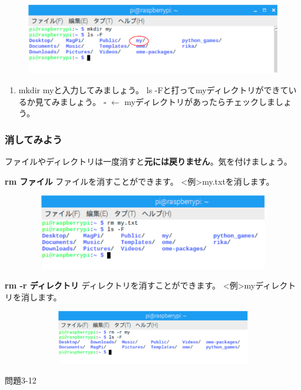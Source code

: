\documentclass[a4paper,dvipdfmx]{jarticle}
\begin{document}
\begin{figure}
\centering
\includegraphics[width=15.794cm,height=3.078cm]{text03-img/text03-img021.png}
\end{figure}
\begin{enumerate}
\item mkdir myと入力してみましょう。\newline
ls
{}-Fと打ってmyディレクトリができているか見てみましょう。\newline
${\square}$ $\leftarrow $
myディレクトリがあったらチェックしましょう。\newline

\end{enumerate}
\subsubsection{消してみよう}
ファイルやディレクトリは一度消すと\textbf{元には戻りません}。気を付けましょう。

\textbf{rm ファイル}\newline
ファイルを消すことができます。\newline
{\textless}例{\textgreater}my.txtを消します。



\begin{figure}
\centering
\includegraphics[width=13.49cm,height=3.293cm]{text03-img/text03-img022.png}
\end{figure}
\textbf{rm {}-r ディレクトリ}\newline
ディレクトリを消すことができます。\newline
{\textless}例{\textgreater}myディレクトリを消します。\newline


\begin{figure}
\centering
\includegraphics[width=19.006cm,height=2.36cm]{text03-img/text03-img023.png}
\end{figure}
{\ttfamily
問題3-12}
\end{document}
